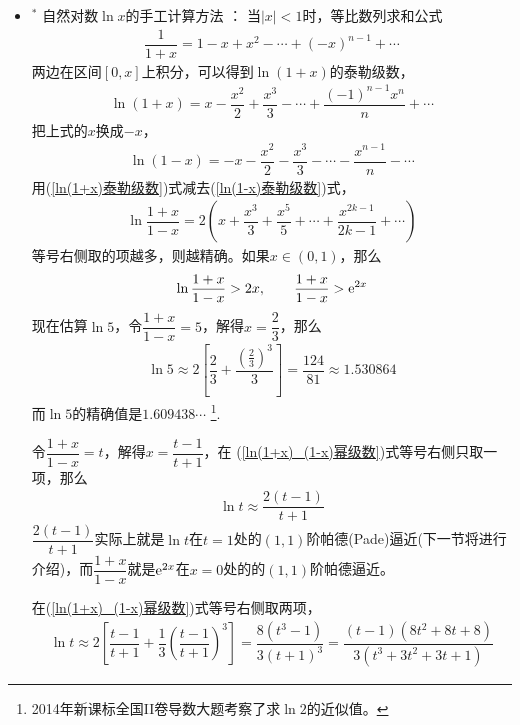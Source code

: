 \begin{itemize}[leftmargin=\inteval{\myitemleftmargin}pt,itemsep=
   \inteval{\myitemitempsep}pt,topsep=\inteval{\myitemtopsep}pt]
\item $^*$ 自然对数$ \ln x $的手工计算方法 ：
当$ |x|<1 $时，等比数列求和公式
\begin{gather*}
    \dfrac{1}{1+x}=1-x+x^2-\cdots+(-x)^{n-1}+\cdots
\end{gather*}
两边在区间$ [0,x] $上积分，可以得到$ \ln(1+x) $的泰勒级数，
\begin{align}\label{ln(1+x)泰勒级数}
    \ln(1+x)=x-\dfrac{x^2}{2}+\dfrac{x^3}{3}-\cdots +\dfrac{(-1)^{n-1}x^{n}}{n}+\cdots 
\end{align}
把上式的$ x $换成$ -x $，
\begin{gather}\label{ln(1-x)泰勒级数}
    \ln(1-x)=-x-\dfrac{x^2}{2}-\dfrac{x^3}{3}-\cdots -\dfrac{x^{n-1}}{n}-\cdots 
\end{gather}
用(\ref{ln(1+x)泰勒级数})式减去(\ref{ln(1-x)泰勒级数})式，
\begin{align}\label{ln(1+x)_(1-x)幂级数}
    \ln\dfrac{1+x}{1-x}=2\left(x+\dfrac{x^3}{3}+\dfrac{x^5}{5}+\cdots +\dfrac{x^{2k-1}}{2k-1} +\cdots \right)
\end{align}
等号右侧取的项越多，则越精确。如果$ x\in (0,1) $，那么
\begin{gather}\label{exp(2x)帕德逼近}
    \ln\dfrac{1+x}{1-x}>2x, \quad \quad \dfrac{1+x}{1-x}>\mathrm{e}^{2x} 
\end{gather}
现在估算$ \ln 5 $，令$ \dfrac{1+x}{1-x}=5 $，解得$ x=\dfrac{2}{3} $，那么
\begin{align*}
    \ln5\approx 2\left[\dfrac{2}{3}+\dfrac{(\frac{2}{3})^3}{3} \right]
    =\dfrac{124}{81} \approx 1.530864
\end{align*}
而$ \ln 5 $的精确值是$ 1.609438\cdots $
\footnote{2014年新课标全国II卷导数大题考察了求$ \ln2 $的近似值。}. 

令$ \dfrac{1+x}{1-x}=t $，解得$ x=\dfrac{t-1}{t+1} $，在
(\ref{ln(1+x)_(1-x)幂级数})式等号右侧只取一项，那么
\begin{align} \label{lnt帕德逼近}
    \ln t\approx \dfrac{2(t-1)}{t+1} 
\end{align}
$ \dfrac{2(t-1)}{t+1} $实际上就是$ \ln t $在$ t=1 $处的$ (1,1) $阶帕德(Pade)逼近(下一节将进行介绍)，而$ \dfrac{1+x}{1-x} $就是$ \mathrm{e}^{2x} $在$ x=0 $处的的$ (1,1) $阶帕德逼近。

在(\ref{ln(1+x)_(1-x)幂级数})式等号右侧取两项，
\begin{align}\label{lnt近似-泰勒取两项}
    \ln t\approx 2\left[\dfrac{t-1}{t+1}+\dfrac{1}{3}\left(\dfrac{t-1}{t+1}\right)^3
    \right]=\dfrac{8(t^3-1)}{3(t+1)^3}=\dfrac{(t-1)(8t^2+8t+8)}{3(t^3+3t^2+3t+1)}
\end{align}


\end{itemize}
